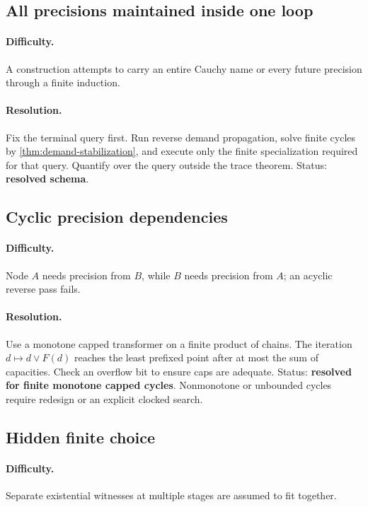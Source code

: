 \subsection{All precisions maintained inside one loop}

\paragraph{Difficulty.}
A construction attempts to carry an entire Cauchy name or every future precision through a finite induction.

\paragraph{Resolution.}
Fix the terminal query first.  Run reverse demand propagation, solve finite cycles by \cref{thm:demand-stabilization}, and execute only the finite specialization required for that query.  Quantify over the query outside the trace theorem.  Status: \textbf{resolved schema}.

\subsection{Cyclic precision dependencies}

\paragraph{Difficulty.}
Node \(A\) needs precision from \(B\), while \(B\) needs precision from \(A\); an acyclic reverse pass fails.

\paragraph{Resolution.}
Use a monotone capped transformer on a finite product of chains.  The iteration \(d\mapsto d\vee F(d)\) reaches the least prefixed point after at most the sum of capacities.  Check an overflow bit to ensure caps are adequate.  Status: \textbf{resolved for finite monotone capped cycles}.  Nonmonotone or unbounded cycles require redesign or an explicit clocked search.

\subsection{Hidden finite choice}

\paragraph{Difficulty.}
Separate existential witnesses at multiple stages are assumed to fit together.

